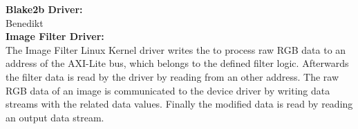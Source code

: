\textbf{Blake2b Driver:}\\
Benedikt\\
\textbf{Image Filter Driver:}\\
The Image Filter Linux Kernel driver writes the to process raw RGB data to an address of the AXI-Lite bus, which belongs to the defined filter logic. Afterwards the filter data is read by the driver by reading from an other address. The raw RGB data of an image is communicated to the device driver by writing data streams with the related data values. Finally the modified data is read by reading an output data stream.\\
